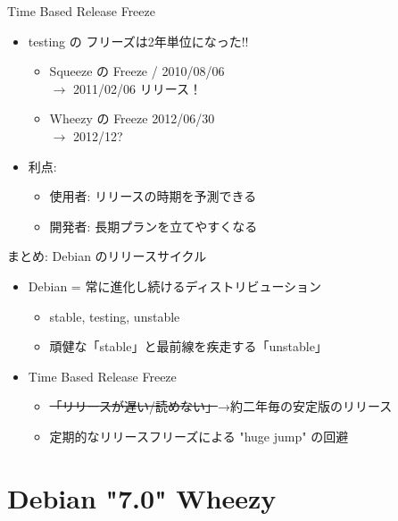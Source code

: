 \documentclass[cjk,dvipdfmx,12pt,compress,%
hyperref={bookmarks=true,bookmarksnumbered=true,bookmarksopen=false,%
  colorlinks=false,%
  pdftitle={第 66 回 関西 Debian 勉強会@KOF2012},%
  pdfauthor={佐々木洋平},%
  pdfsubject={資料},%
}]{beamer}
\begin{document}
\begin{frame}{Time Based Release Freeze}

\begin{itemize}
\item testing の フリーズは2年単位になった!!
  \begin{itemize}
    \item Squeeze の Freeze / 2010/08/06 \\$\rightarrow$ 2011/02/06 リリース！
    \item Wheezy の Freeze 2012/06/30 \\$\rightarrow$ 2012/12?
  \end{itemize}
\item 利点:
  \begin{itemize}
    \item 使用者: リリースの時期を予測できる
    \item 開発者: 長期プランを立てやすくなる
  \end{itemize}
\end{itemize}

\end{frame}

\begin{frame}{まとめ: Debian のリリースサイクル}

\begin{itemize}
  \item Debian = 常に進化し続けるディストリビューション
  \begin{itemize}
    \item stable, testing, unstable
    \item 頑健な「stable」と最前線を疾走する「unstable」
  \end{itemize}
  \item Time Based Release Freeze
  \begin{itemize}
    \item \sout{「リリースが遅い/読めない」}→約二年毎の安定版のリリース
    \item 定期的なリリースフリーズによる "huge jump" の回避
  \end{itemize}
\end{itemize}

\end{frame}


\section{Debian "7.0" Wheezy}
\settitleslide
{}
\begin{frame}\end{frame}
\setdefaultslide
\end{document}
